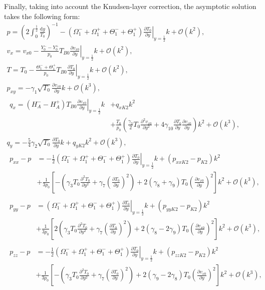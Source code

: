 \documentclass[aip,pof,preprint]{revtex4-1}
\newcommand{\dd}{\mathrm{d}}
\newcommand{\pder}[2][]{\frac{\partial#1}{\partial#2}}
\newcommand{\pderdual}[2][]{\frac{\partial^2#1}{\partial#2^2}}
\newcommand{\OO}[1]{\mathcal{O}(#1)}
\begin{document}
Finally, taking into account the Knudsen-layer correction, the asymptotic solution takes the following form:
\begin{gather}
    p = \left( 2\int_{0}^\frac12\frac{\dd{y}}{T_0} \right)^{-1}
        - (\Omega_1^-+\Omega_1^+ + \Theta_1^-+\Theta_1^+)\left.\pder[T_0]{y}\right|_{y=\frac12}k + \OO{k^2}, \label{eq:Hilbert_p}\\
    v_x = v_{x0} - \frac{Y_0^--Y_0^+}{p_0}T_{B0}\left.\pder[v_{x0}]{y}\right|_{y=\frac12}k + \OO{k^2}, \label{eq:Hilbert_U}\\
    T = T_0 - \frac{\Theta_1^-+\Theta_1^+}{p_0}T_{B0}\left.\pder[T_0]{y}\right|_{y=\frac12}k + \OO{k^2}, \label{eq:Hilbert_T}\\
    p_{xy} = -\gamma_1\sqrt{T_0}\pder[v_{x0}]{y}k + \OO{k^3}, \label{eq:Hilbert_Pxy}\\
    \begin{aligned}
        q_x = (H_A^--H_A^+)T_{B0}\left.\pder[v_{x0}]{y}\right|_{y=\frac12}k &+ q_{xK2}k^2 \\
        &+ \frac{T_0}{p_0}\left(\frac{\gamma_3}2 T_0 \pderdual[v_{x0}]{y}
        + 4\gamma_{10} \pder[T_0]{y}\pder[v_{x0}]{y}\right)k^2 + \OO{k^3},
    \end{aligned}\label{eq:Hilbert_Qx}\\
    q_y = -\frac54\gamma_2\sqrt{T_0}\pder[T_0]{y}k + q_{yK2}k^2 + \OO{k^3}, \label{eq:Hilbert_Qy}\\
    \begin{aligned}
    p_{xx} - p &= -\frac12 (\Omega_1^-+\Omega_1^+ + \Theta_1^-+\Theta_1^+)\left.\pder[T_0]{y}\right|_{y=\frac12}k
        + (p_{xxK2}-p_{K2})k^2 \\
        &+ \frac1{3p_0}\left[-\left(\gamma_3 T_0 \pderdual[T_0]{y} + \gamma_7\left(\pder[T_0]{y}\right)^2\right)
        + 2(\gamma_8+\gamma_9)T_0\left(\pder[v_{x0}]{y}\right)^2\right]k^2 + \OO{k^3},
    \end{aligned}\label{eq:Hilbert_Pxx}\\
    \begin{aligned}
    p_{yy} - p &= (\Omega_1^-+\Omega_1^+ + \Theta_1^-+\Theta_1^+)\left.\pder[T_0]{y}\right|_{y=\frac12}k
        + (p_{yyK2}-p_{K2})k^2 \\
        &+ \frac1{3p_0}\left[2\left(\gamma_3 T_0 \pderdual[T_0]{y} + \gamma_7\left(\pder[T_0]{y}\right)^2\right)
        + 2(\gamma_8-2\gamma_9)T_0\left(\pder[v_{x0}]{y}\right)^2\right]k^2 + \OO{k^3},
    \end{aligned}\label{eq:Hilbert_Pyy}\\
    \begin{aligned}
    p_{zz} - p &= -\frac12 (\Omega_1^-+\Omega_1^+ + \Theta_1^-+\Theta_1^+)\left.\pder[T_0]{y}\right|_{y=\frac12}k
        + (p_{zzK2}-p_{K2})k^2 \\
        &+ \frac1{3p_0}\left[-\left(\gamma_3 T_0 \pderdual[T_0]{y} + \gamma_7\left(\pder[T_0]{y}\right)^2\right)
        + 2(\gamma_9-2\gamma_8)T_0\left(\pder[v_{x0}]{y}\right)^2\right]k^2 + \OO{k^3},
    \end{aligned}\label{eq:Hilbert_Pzz}
\end{gather}
\end{document}
